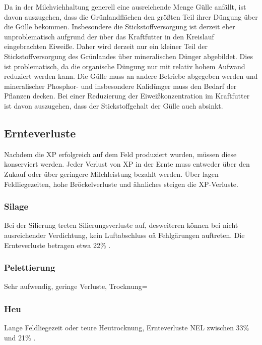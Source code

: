 \documentclass[12pt,titlepage]{scrartcl}
\begin{document}
Da in der Milchviehhaltung generell eine ausreichende Menge Gülle anfällt, ist davon auszugehen, dass die Grünlandflächen den größten Teil ihrer Düngung über die Gülle bekommen.
Insbesondere die Stickstoffversorgung ist derzeit eher unproblematisch aufgrund der über das Kraftfutter in den Kreislauf eingebrachten Eiweiße.
Daher wird derzeit nur ein kleiner Teil der Stickstoffversorgung des Grünlandes über mineralischen Dünger abgebildet.
Dies ist problematisch, da die organische Düngung nur mit relativ hohem Aufwand reduziert werden kann.
Die Gülle muss an andere Betriebe abgegeben werden und mineralischer Phosphor- und insbesondere Kalidünger muss den Bedarf der Pflanzen decken.
Bei einer Reduzierung der Eiweißkonzentration im Kraftfutter ist davon auszugehen, dass der Stickstoffgehalt der Gülle auch absinkt.

\subsection{Ernteverluste}
\label{subsec:Lit:Ernte}

Nachdem die \ac{XP} erfolgreich auf dem Feld produziert wurden, müssen diese konserviert werden.
Jeder Verlust von \ac{XP} in der Ernte muss entweder über den Zukauf oder über geringere Milchleistung bezahlt werden.
Über lagen Feldliegezeiten, hohe Bröckelverluste und ähnliches steigen die \ac{XP}-Verluste.

\subsubsection{Silage}
\label{subsub:Silange}
Bei der Silierung treten Silierungsverluste auf, desweiteren können bei nicht ausreichender Verdichtung, kein Luftabschluss oä Fehlgärungen auftreten.
Die Ernteverluste betragen etwa 22\% \parencite[30]{fritz2018wirtschaftliche}.


\subsubsection{Pelettierung}
\label{subsub:Peletts}
Sehr aufwendig, geringe Verluste, Trocknung=

\subsubsection{Heu}
\label{subsub:Heu}
Lange Feldliegezeit oder teure Heutrocknung, Ernteverluste \ac{NEL} zwischen 33\% und 21\% \parencite[30]{fritz2018wirtschaftliche}.
\end{document}
